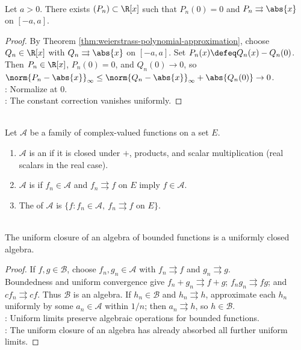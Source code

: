 \begin{corollary} \label{cor:absolute-value-polynomial-approximation} \\
Let $a>0$. There exists $(P_n)\subset\R[x]$ such that $P_n(0)=0$ and $P_n\rightrightarrows\abs{x}$ on $[-a,a]$.
\begin{proof} By Theorem \ref{thm:weierstrass-polynomial-approximation}, choose $Q_n\in\R[x]$ with $Q_n\rightrightarrows\abs{x}$ on $[-a,a]$. Set $P_n(x)\defeq Q_n(x)-Q_n(0)$.\\
Then $P_n\in\R[x]$, $P_n(0)=0$, and $Q_n(0)\to0$, so $\norm{P_n-\abs{x}}_\infty\leq\norm{Q_n-\abs{x}}_\infty+\abs{Q_n(0)}\to0$.\\
: Normalize at $0$.\\
: The constant correction vanishes uniformly.
\end{proof}
\end{corollary}

\begin{definition} \label{def:algebra-uniform-closure-functions} \\
Let $\mathcal{A}$ be a family of complex-valued functions on a set $E$.
\begin{enumerate}[label=(\roman*)]
\setlength{\itemsep}{0pt}
\item $\mathcal{A}$ is an  if it is closed under $+$, products, and scalar multiplication (real scalars in the real case).
\item $\mathcal{A}$ is  if $f_n\in\mathcal{A}$ and $f_n\rightrightarrows f$ on $E$ imply $f\in\mathcal{A}$.
\item The  of $\mathcal{A}$ is $\{f:f_n\in\mathcal{A},\ f_n\rightrightarrows f\text{ on }E\}$.
\end{enumerate}
\end{definition}

\begin{theorem} \label{thm:uniform-closure-algebra} \\
The uniform closure of an algebra of bounded functions is a uniformly closed algebra.
\begin{proof}
If $f,g\in\mathcal{B}$, choose $f_n,g_n\in\mathcal{A}$ with $f_n\rightrightarrows f$ and $g_n\rightrightarrows g$.\\
Boundedness and uniform convergence give $f_n+g_n\rightrightarrows f+g$; $f_ng_n\rightrightarrows fg$; and $cf_n\rightrightarrows cf$.
Thus $\mathcal{B}$ is an algebra. If $h_n\in\mathcal{B}$ and $h_n\rightrightarrows h$, approximate each $h_n$ uniformly by some $a_n\in\mathcal{A}$ within $1/n$; then $a_n\rightrightarrows h$, so $h\in\mathcal{B}$.\\
: Uniform limits preserve algebraic operations for bounded functions.\\
: The uniform closure of an algebra has already absorbed all further uniform limits.
\end{proof}
\end{theorem}

